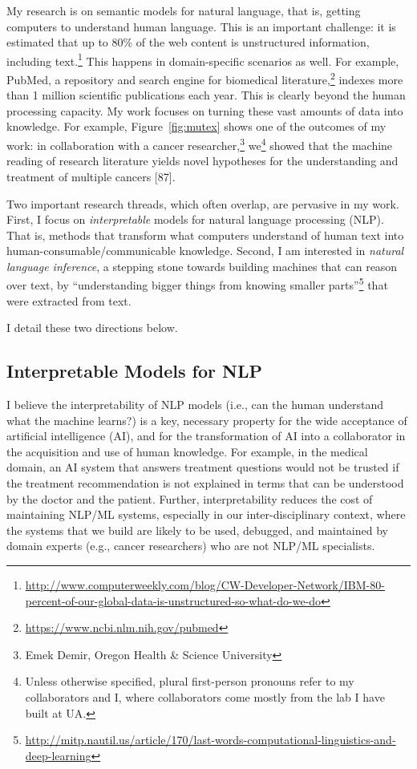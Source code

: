 \documentclass[10pt]{article}
\begin{document}
My research is on semantic models for natural language, that is, getting computers to understand human language. This is an important challenge: it is estimated that up to 80\% of the web content is unstructured information, including text.\footnote{{\scriptsize \url{http://www.computerweekly.com/blog/CW-Developer-Network/IBM-80-percent-of-our-global-data-is-unstructured-so-what-do-we-do}}}
This happens in domain-specific scenarios as well.
For example, PubMed, a repository and search engine for biomedical literature,\footnote{{\scriptsize \url{https://www.ncbi.nlm.nih.gov/pubmed}}} indexes more than 1 million scientific publications each year. This is clearly beyond the human processing capacity.  
My work focuses on turning these vast amounts of data into knowledge. 
For example, Figure~\ref{fig:mutex} shows one of the outcomes of my work: in collaboration with a cancer researcher,\footnote{Emek Demir, Oregon Health \& Science University} we\footnote{Unless otherwise specified, plural first-person pronouns refer to my collaborators and I, where collaborators come mostly from the lab I have built at UA.} showed that the machine reading of research literature yields novel hypotheses for the understanding and treatment of multiple cancers [87]. 

Two important research threads, which often overlap, are pervasive in my work. First, I focus on {\em interpretable} models for natural language processing (NLP).
That is, methods that transform what computers understand of human text into human-consumable/communicable knowledge.
Second, I am interested in {\em natural language inference}, a stepping stone towards building machines that can reason over text, by ``understanding bigger things from knowing smaller parts''\footnote{{\scriptsize \url{http://mitp.nautil.us/article/170/last-words-computational-linguistics-and-deep-learning}}} that were extracted from text.

I detail these two directions below. 

\subsection*{Interpretable Models for NLP}

I believe the interpretability of NLP models (i.e., can the human understand what the machine learns?)
 is a key, necessary property for the wide acceptance of artificial intelligence (AI), and for the transformation of AI into a collaborator in the acquisition and use of human knowledge. 
For example, in the medical domain, an AI system that answers treatment questions would not be trusted if 
the treatment recommendation is not explained in terms that can be understood by the doctor and the patient. Further, interpretability  reduces the cost of maintaining NLP/ML systems, especially in our inter-disciplinary context, where the systems that we build are likely to be used, debugged, and maintained by domain experts (e.g., cancer researchers) who are not NLP/ML specialists. 
\end{document}
